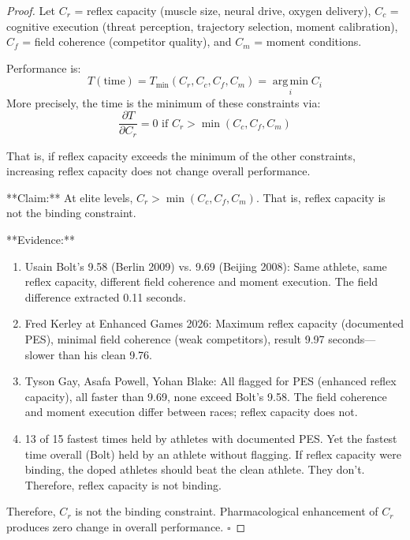 \documentclass[11pt,twocolumn]{article}
\theoremstyle{definition}
\theoremstyle{remark}
\newcommand{\argmin}{\operatorname*{arg\,min}}
\begin{document}
\begin{proof}
Let $C_r$ = reflex capacity (muscle size, neural drive, oxygen delivery), $C_c$ = cognitive execution (threat perception, trajectory selection, moment calibration), $C_f$ = field coherence (competitor quality), and $C_m$ = moment conditions.

Performance is:
\begin{equation}
T(\text{time}) = T_{\min}(C_r, C_c, C_f, C_m) = \argmin_i C_i
\end{equation}
More precisely, the time is the minimum of these constraints via:
\begin{equation}
\frac{\partial T}{\partial C_r} = 0 \text{ if } C_r > \min(C_c, C_f, C_m)
\end{equation}

That is, if reflex capacity exceeds the minimum of the other constraints, increasing reflex capacity does not change overall performance.

**Claim:** At elite levels, $C_r > \min(C_c, C_f, C_m)$. That is, reflex capacity is not the binding constraint.

**Evidence:**
\begin{enumerate}[leftmargin=1.2em]
\item Usain Bolt's 9.58 (Berlin 2009) vs. 9.69 (Beijing 2008): Same athlete, same reflex capacity, different field coherence and moment execution. The field difference extracted 0.11 seconds.

\item Fred Kerley at Enhanced Games 2026: Maximum reflex capacity (documented PES), minimal field coherence (weak competitors), result 9.97 seconds—slower than his clean 9.76.

\item Tyson Gay, Asafa Powell, Yohan Blake: All flagged for PES (enhanced reflex capacity), all faster than 9.69, none exceed Bolt's 9.58. The field coherence and moment execution differ between races; reflex capacity does not.

\item 13 of 15 fastest times held by athletes with documented PES. Yet the fastest time overall (Bolt) held by an athlete without flagging. If reflex capacity were binding, the doped athletes should beat the clean athlete. They don't. Therefore, reflex capacity is not binding.
\end{enumerate}

Therefore, $C_r$ is not the binding constraint. Pharmacological enhancement of $C_r$ produces zero change in overall performance. $\square$
\end{proof}
\end{document}
